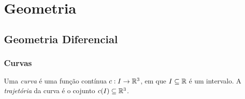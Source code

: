 \part{Geometria}

\chapter{Geometria Diferencial}

\section{Curvas}

\begin{defi}
Uma \emph{curva} é uma função contínua $c: I \to \mathbb{R}^3$, em que $I \subseteq \mathbb{R}$ é um intervalo. A \emph{trajetória} da curva é o cojunto $c(I) \subseteq \mathbb{R}^3$.
\end{defi}

